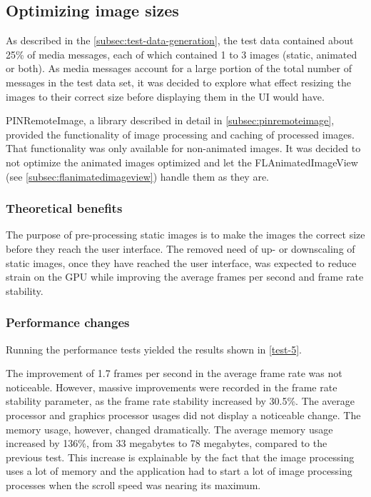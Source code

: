 \documentclass[a4paper,12pt]{article}
\begin{document}
\subsection{Optimizing image sizes}
\label{subsec:optimizing-image-sizes}
As described in the \autoref{subsec:test-data-generation}, the test data contained about 25\% of media messages, each of which contained 1 to 3 images (static, animated or both). As media messages account for a large portion of the total number of messages in the test data set, it was decided to explore what effect resizing the images to their correct size before displaying them in the UI would have.

PINRemoteImage, a library described in detail in \autoref{subsec:pinremoteimage}, provided the functionality of image processing and caching of processed images. That functionality was only available for non-animated images. It was decided to not optimize the animated images optimized and let the FLAnimatedImageView (see \autoref{subsec:flanimatedimageview}) handle them as they are.

\subsubsection{Theoretical benefits}
The purpose of pre-processing static images is to make the images the correct size before they reach the user interface. The removed need of up- or downscaling of static images, once they have reached the user interface, was expected to reduce strain on the GPU while improving the average frames per second and frame rate stability.

\subsubsection{Performance changes}
Running the performance tests yielded the results shown in \autoref{test-5}.

The improvement of 1.7 frames per second in the average frame rate was not noticeable. However, massive improvements were recorded in the frame rate stability parameter, as the frame rate stability increased by 30.5\%. The average processor and graphics processor usages did not display a noticeable change. The memory usage, however, changed dramatically. The average memory usage increased by 136\%, from 33 megabytes to 78 megabytes, compared to the previous test. This increase is explainable by the fact that the image processing uses a lot of memory and the application had to start a lot of image processing processes when the scroll speed was nearing its maximum.
\end{document}
